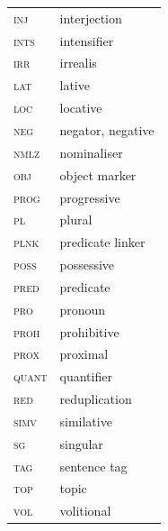 \documentclass[output=paper,colorlinks,citecolor=brown,draft]{langscibook}
\begin{document}
\begin{tabularx}{.45\textwidth}{lQ}%
\textsc{inj} & interjection\\
\textsc{ints} & intensifier\\
\textsc{irr} & irrealis\\
\textsc{lat} & lative\\
\textsc{loc} & locative\\
\textsc{neg} & negator, negative\\
\textsc{nmlz} & nominaliser\\
\textsc{obj} & object marker\\
\textsc{prog} & progressive \\
\textsc{pl} & plural\\
\textsc{plnk} & predicate linker\\
\textsc{poss} & possessive\\
\textsc{pred} & predicate \\
\textsc{pro} & pronoun \\
\textsc{proh} & prohibitive\\
\textsc{prox} & proximal\\
\textsc{quant} & quantifier\\
\textsc{red} & reduplication \\
\textsc{simv} & similative \\
\textsc{sg} & singular\\
\textsc{tag} & sentence tag\\
\textsc{top} & topic\\
\textsc{vol} & volitional\\
\end{tabularx}

\newpage
\largerpage
\printbibliography[heading=subbibliography,notkeyword=this]
\largerpage
\end{document}

